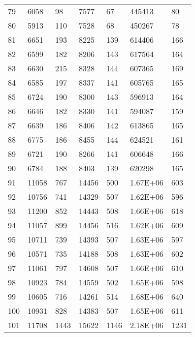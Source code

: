 \documentclass[paper=a4, fontsize=11pt]{scrartcl}
\numberwithin{equation}{section}
\numberwithin{figure}{section}
\numberwithin{table}{section}
\begin{document}
{{\begin{tabular}{l || l | l | l | l | l | l }
    79  &  6058   &  98      & 7577   &   67     & 445413    & 80      \\
    80  &  5913   &  110     & 7528   &   68     & 450267    & 78      \\
    81  &  6651   &  193     & 8225   &   139    & 614406    & 166     \\
    82  &  6599   &  182     & 8206   &   143    & 617564    & 164     \\
    83  &  6630   &  215     & 8328   &   144    & 607365    & 169     \\
    84  &  6585   &  197     & 8337   &   141    & 605765    & 165     \\
    85  &  6724   &  190     & 8300   &   143    & 596913    & 164     \\
    86  &  6646   &  182     & 8330   &   141    & 594087    & 159     \\
    87  &  6639   &  186     & 8406   &   142    & 613865    & 165     \\
    88  &  6775   &  186     & 8455   &   144    & 624521    & 161     \\
    89  &  6721   &  190     & 8266   &   141    & 606648    & 166     \\
    90  &  6784   &  188     & 8403   &   139    & 620298    & 165     \\
    91  &  11058  &  767     & 14456  &   500    & 1.67E+06  & 603     \\
    92  &  10756  &  741     & 14329  &   507    & 1.62E+06  & 596     \\
    93  &  11200  &  852     & 14443  &   508    & 1.66E+06  & 618     \\
    94  &  11057  &  899     & 14456  &   516    & 1.62E+06  & 609     \\
    95  &  10711  &  739     & 14393  &   507    & 1.63E+06  & 597     \\
    96  &  10571  &  735     & 14188  &   508    & 1.63E+06  & 602     \\
    97  &  11061  &  797     & 14608  &   507    & 1.66E+06  & 610     \\
    98  &  10923  &  784     & 14559  &   502    & 1.65E+06  & 598     \\
    99  &  10605  &  716     & 14261  &   514    & 1.68E+06  & 640     \\
    100 &  10931  &  828     & 14383  &   507    & 1.65E+06  & 611     \\
    101 &  11708  &  1443    & 15622  &   1146   & 2.18E+06  & 1231    \\

\end{tabular}}}
\end{document}
